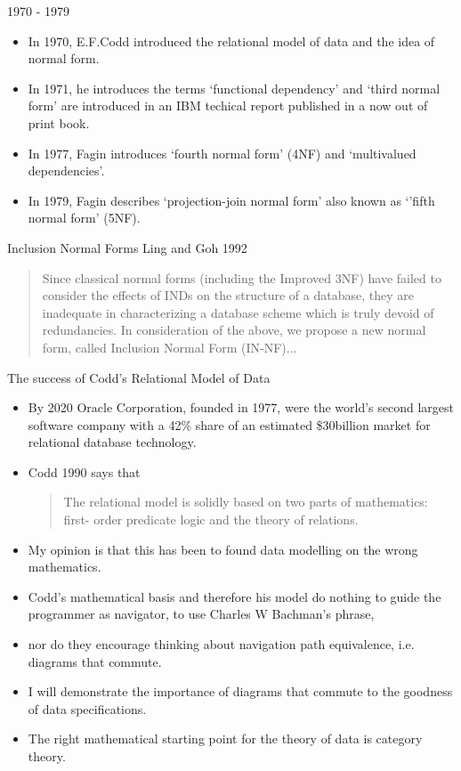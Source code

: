 
\begin{frame}{1970 - 1979}
\begin{itemize}
\item In 1970, E.F.Codd introduced the relational model of data and the idea of normal form.
\item In 1971, he introduces the terms `functional dependency' and  `third normal form' are introduced in an IBM techical report published in a now out of print book.
\item In 1977, Fagin introduces `fourth normal form' (4NF) and `multivalued dependencies'.
\item In 1979, Fagin describes `projection-join normal form' also known as `'fifth normal form' (5NF).
\end{itemize} 
\end{frame}

\begin{frame}{Inclusion Normal Forms}
Ling and Goh 1992 
\begin{quote}
Since
classical normal forms (including the Improved 3NF)
have failed to consider the effects of INDs on the structure
of a database, they are inadequate in characterizing a
database scheme which is truly devoid of redundancies.
In consideration of the above, we propose a new normal
form, called Inclusion Normal Form (IN-NF)...
\end{quote}
\end{frame}

\begin{frame}{The success of Codd's Relational Model of Data}
\begin{itemize}
\item By 2020 Oracle Corporation, founded in 1977, were the world's second largest software company with a 42\% share of an 
estimated \$30billion market for relational database technology. 
\item Codd 1990 says that
\begin{quote}
The relational model is solidly based on two parts of mathematics: first-
order predicate logic and the theory of relations.
\end{quote}
\item My opinion is that this has been to found data modelling on the wrong mathematics. 
\item Codd's mathematical basis and therefore his  model  do nothing to guide the programmer as navigator, to use Charles W Bachman's phrase, 
\item nor do they encourage thinking about navigation path equivalence, i.e. diagrams that commute.
\item I will demonstrate the importance of diagrams that commute to the goodness of data specifications.
\item The right mathematical starting point for the theory of data is category theory.
\end{itemize}
\end{frame}
 


